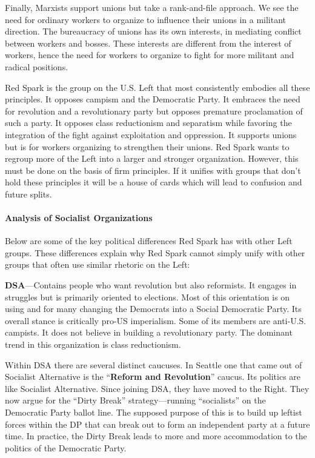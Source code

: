 Finally, Marxists support unions but take a rank-and-file approach. We see the need for ordinary workers to organize to influence their unions in a militant direction. The bureaucracy of unions has its own interests, in mediating conflict between workers and bosses. These interests are different from the interest of workers, hence the need for workers to organize to fight for more militant and radical positions.

Red Spark is the group on the U.S. Left that most consistently embodies all these principles. It opposes campism and the Democratic Party. It embraces the need for revolution and a revolutionary party but opposes premature proclamation of such a party. It opposes class reductionism and separatism while favoring the integration of the fight against exploitation and oppression. It supports unions but is for workers organizing to strengthen their unions. Red Spark wants to regroup more of the Left into a larger and stronger organization. However, this must be done on the basis of firm principles. If it unifies with groups that don't hold these principles it will be a house of cards which will lead to confusion and future splits.

\paragraph{Analysis of Socialist Organizations}

Below are some of the key political differences Red Spark has with other Left groups. These differences explain why Red Spark cannot simply unify with other groups that often use similar rhetoric on the Left:

\textbf{DSA}---Contains people who want revolution but also reformists. It engages in struggles but is primarily oriented to elections. Most of this orientation is on using and for many changing the Democrats into a Social Democratic Party. Its overall stance is critically pro-US imperialism. Some of its members are anti-U.S. campists. It does not believe in building a revolutionary party. The dominant trend in this organization is class reductionism.

Within DSA there are several distinct caucuses. In Seattle one that came out of Socialist Alternative is the ``\textbf{Reform and Revolution}'' caucus. Its politics are like Socialist Alternative. Since joining DSA, they have moved to the Right. They now argue for the ``Dirty Break'' strategy---running ``socialists'' on the Democratic Party ballot line. The supposed purpose of this is to build up leftist forces within the DP that can break out to form an independent party at a future time. In practice, the Dirty Break leads to more and more accommodation to the politics of the Democratic Party.

